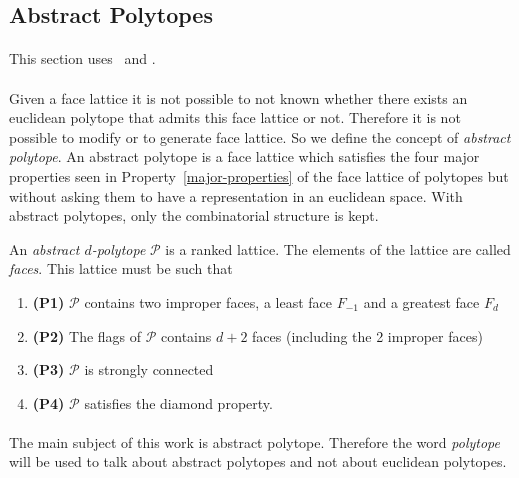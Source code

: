 \subsection{Abstract Polytopes}

\paragraph{}
This section uses~\cite{incidenceGeometry} and \cite{abstractRegularPolytopes}.

\paragraph{}
Given a face lattice it is not possible to not known whether there exists an euclidean polytope that admits this face lattice or not. Therefore it is not possible to modify or to generate face lattice. So we define the concept of \textit{abstract polytope}. An abstract polytope is a face lattice which satisfies the four major properties seen in Property~\ref{major-properties} of the face lattice of polytopes but without asking them to have a representation in an euclidean space. With abstract polytopes, only the combinatorial structure is kept.

\begin{definition}
  An \textit{abstract $d$-polytope} $\mathcal P$ is a ranked lattice. The elements of the lattice are called \textit{faces}. This lattice must be such that
  \begin{enumerate}
    \item \textbf{(P1)} $\mathcal P$ contains two improper faces, a least face $F_{-1}$ and a greatest face $F_d$
    \item \textbf{(P2)} The flags of $\mathcal P$ contains $d + 2$ faces (including the 2 improper faces)
    \item \textbf{(P3)} $\mathcal P$ is strongly connected
    \item \textbf{(P4)} $\mathcal P$ satisfies the diamond property.
  \end{enumerate}
\end{definition}

\paragraph{}
The main subject of this work is abstract polytope. Therefore the word \textit{polytope} will be used to talk about abstract polytopes and not about euclidean polytopes.

